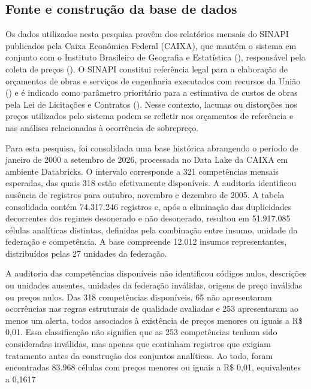 \subsection{Fonte e construção da base de dados}


Os dados utilizados nesta pesquisa provêm dos relatórios mensais do SINAPI publicados 
pela Caixa Econômica Federal (CAIXA), que mantém o sistema em conjunto com o Instituto 
Brasileiro de Geografia e Estatística (), responsável pela coleta de 
preços (). O SINAPI constitui referência legal 
para a elaboração de orçamentos de obras e serviços de engenharia executados com 
recursos da União () e é indicado como parâmetro prioritário para a 
estimativa de custos de obras pela Lei de Licitações e Contratos (). 
Nesse contexto, lacunas ou distorções nos preços utilizados pelo sistema podem se 
refletir nos orçamentos de referência e nas análises relacionadas à ocorrência de 
sobrepreço.

Para esta pesquisa, foi consolidada uma base histórica abrangendo o período de janeiro 
de 2000 a setembro de 2026, processada no Data Lake da CAIXA em ambiente Databricks. 
O intervalo corresponde a 321 competências mensais esperadas, das quais 318 estão 
efetivamente disponíveis. A auditoria identificou ausência de registros para outubro, 
novembro e dezembro de 2005. A tabela consolidada contém 74.317.246 registros e, após a 
eliminação das duplicidades decorrentes dos regimes desonerado e não desonerado, 
resultou em 51.917.085 células analíticas distintas, definidas pela combinação entre 
insumo, unidade da federação e competência. A base compreende 12.012 insumos 
representantes, distribuídos pelas 27 unidades da federação.

A auditoria das competências disponíveis não identificou códigos nulos, descrições ou 
unidades ausentes, unidades da federação inválidas, origens de preço inválidas ou preços 
nulos. Das 318 competências disponíveis, 65 não apresentaram ocorrências nas regras 
estruturais de qualidade avaliadas e 253 apresentaram ao menos um alerta, todos 
associados à existência de preços menores ou iguais a R\$ 0,01. Essa classificação não 
significa que as 253 competências tenham sido consideradas inválidas, mas apenas que 
continham registros que exigiam tratamento antes da construção dos conjuntos analíticos. 
Ao todo, foram encontradas 83.968 células com preços menores ou iguais a R\$ 0,01, 
equivalentes a 0,1617%

